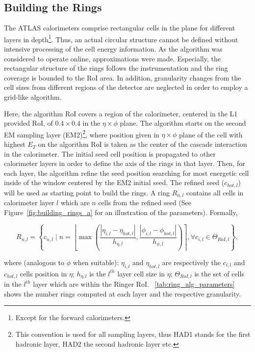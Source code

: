 \subsection{Building the Rings}\label{top:algorithm}

The ATLAS calorimeters comprise rectangular cells in the
\etaphi plane for different layers in depth\footnote{Except for the forward calorimeters.}. Thus, an actual circular structure cannot be defined
without intensive processing of the cell energy information. As the algorithm was
considered to operate online, approximations were made. Especially, the rectangular structure of
the rings follows the instrumentation and the ring coverage is bounded to the RoI area. In addition, granularity changes from the cell sizes from different regions of the detector are neglected in order to employ a grid-like algorithm.


Here, the algorithm RoI covers a
region of the calorimeter, centered in the L1 provided RoI, of
$0.4\times0.4$ in the $\eta\times\phi$ plane. The algorithm
starts on the second EM sampling layer (EM2)\footnote{This convention is used for all sampling layers, thus HAD1 stands for the first hadronic layer, HAD2 the second hadronic layer etc.}, where position given in $\eta\times\phi$ plane of the cell with
highest $E_T$ on the algorithm RoI is taken as the center of the cascade
interaction in the calorimeter. The initial seed cell position is propagated to other calorimeter layers in order to define the axis of the rings in that layer. Then, for each layer, the algorithm refine the seed position searching for most energetic cell inside of the window centered by the EM2 initial seed. The refined seed ($c_{hot,l}$) will be used as starting point to build the rings. A ring $R_{n,l}$ contains all cells in calorimeter layer $l$ which are $n$ cells from the refined seed (See Figure~\ref{fig:building_rings_a} for an illustration of the parameters). Formally,


\begin{equation}
R_{n,l} = \left\{c_{n,l} \mid n = \left\lfloor \max{\left( 
\frac{| \eta_{i,l} - \eta_{hot,l} |}{h_{\eta,l}}, 
\frac{| \phi_{i,l} - \phi_{hot,l} |}{h_{\phi,l}} 
\right)} \right\rceil, 
\forall c_{i,l} \in
\Theta_{RoI,l}
\right\},
\end{equation}



\noindent where (analogous to $\phi$ when suitable): $\eta_{i,l}$
and $\eta_{hot,l}$ are respectively the $c_{i,l}$ and $c_{hot,l}$
cells position in $\eta$; $h_{\eta,l}$ is the $l^{th}$ layer cell size in $\eta$; $\Theta_{RoI,l}$ is the set of cells
in the $l^{th}$ layer which are within the Ringer RoI.
\tablename~\ref{tab:ring_alg_parameters} shows the number rings computed at each layer and the respective granularity.

